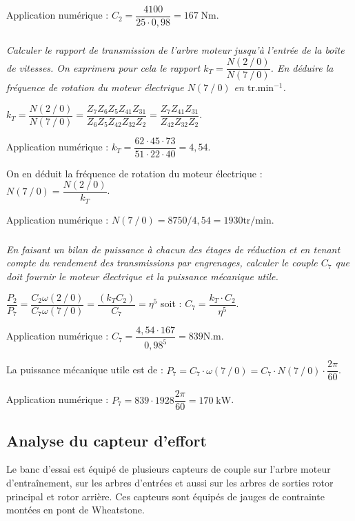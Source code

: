 \documentclass[10pt,fleqn]{article} %
\begin{document}
\begin{multicols}{2}
\begin{corrige}
Application numérique : 	$C_2=\dfrac{4100}{25\cdot 0,98}=167\; \text{Nm}$.


\end{corrige}
\else
\fi

\subparagraph{}
\textit{Calculer le rapport de transmission de l'arbre moteur jusqu'à l'entrée de la boîte de vitesses. On exprimera pour cela le rapport $k_T=  \dfrac{N(2⁄0)}{N(7⁄0)}$. En déduire la fréquence de rotation du moteur électrique $N(7⁄0)$ en $\text{tr.min}^{-1}$.}

\ifprof
\begin{corrige}
$k_T= \dfrac{N(2⁄0)}{N(7⁄0)}=\dfrac{Z_7 Z_6 Z_5 Z_41 Z_31}{Z_6 Z_5 Z_42 Z_32 Z_2} =\dfrac{Z_7 Z_41 Z_31}{Z_42 Z_32 Z_2}$.


Application numérique : 	$k_T=\dfrac{62\cdot 45\cdot73}{51\cdot22\cdot40}=4,54$.

On en déduit la fréquence de rotation du moteur électrique : $N(7⁄0)=\dfrac{N(2⁄0)}{k_T}$.

Application numérique : $N(7⁄0)=8750/4,54=1930 \text{tr/min}$.



\end{corrige}
\else
\fi

\subparagraph{}
\textit{En faisant un bilan de puissance à chacun des étages de réduction et en tenant compte du rendement des transmissions par engrenages, calculer le couple $C_7$ que doit fournir le moteur électrique et la puissance mécanique utile.}

\ifprof

\begin{corrige}

$\dfrac{P_2}{P_7} = \dfrac{C_2 \omega (2⁄0)}{C_7 \omega (7⁄0)}=\dfrac{(k_T C_2)}{C_7} =\eta^5$ soit : $C_7= \dfrac{k_T\cdot C_2}{\eta^5}$.

Application numérique : 	$C_7=\dfrac{4,54 \cdot 167}{0,98^5} = 839 \text{N.m}$.

La puissance mécanique utile est de :	$P_7=C_7 \cdot \omega (7⁄0) = C_7\cdot N(7⁄0)\cdot \dfrac{2\pi}{60}$.

Application numérique :	$P_7=839 \cdot 1928 \dfrac{2\pi}{60}=170 \; \text{kW}$.



\end{corrige}
\else
\fi




\subsection*{Analyse du capteur d'effort}
Le banc d'essai est équipé de plusieurs capteurs de couple sur l'arbre moteur d'entraînement, sur les arbres d'entrées et aussi sur les arbres de sorties rotor principal et rotor arrière. Ces capteurs sont équipés de jauges de contrainte montées en pont de Wheatstone.




\end{multicols}
\end{document}
